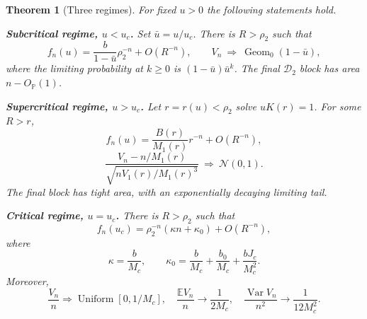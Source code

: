 \documentclass[11pt,a4paper]{article}
\numberwithin{equation}{section}
\newtheorem{theorem}{Theorem}[section]
\theoremstyle{definition}\newtheorem{definition}[theorem]{Definition}
\theoremstyle{remark}\newtheorem{remark}[theorem]{Remark}
\newcommand{\E}{\mathbb E}
\newcommand{\Prob}{\mathbb P}
\newcommand{\Var}{\operatorname{Var}}
\newcommand{\calD}{\mathcal D}
\DeclareMathOperator{\Unif}{Uniform}
\begin{document}
\begin{theorem}[Three regimes]\label{vmb:cw:thm:three}
For fixed $u>0$ the following statements hold.

\smallskip\noindent
\textbf{Subcritical regime, $u<u_c$.} Set $\bar u=u/u_c$. There is
$R>\rho_2$ such that
\begin{equation}\label{vmb:cw:eq:subcrit}
 f_n(u)=\frac b{1-\bar u}\rho_2^{-n}+O(R^{-n}),\qquad
 V_n\ \Longrightarrow\ \operatorname{Geom}_0(1-\bar u),
\end{equation}
where the limiting probability at $k\ge0$ is $(1-\bar u)\bar u^k$. The final
$\calD_2$ block has area $n-O_{\Prob}(1)$.

\smallskip\noindent
\textbf{Supercritical regime, $u>u_c$.} Let $r=r(u)<\rho_2$ solve $uK(r)=1$.
For some $R>r$,
\begin{equation}\label{vmb:cw:eq:supercrit}
 f_n(u)=\frac{B(r)}{M_1(r)}r^{-n}+O(R^{-n}),
\end{equation}
\begin{equation}\label{vmb:cw:eq:superCLT}
 \frac{V_n-n/M_1(r)}{\sqrt{nV_1(r)/M_1(r)^3}}
 \ \Longrightarrow\ \mathcal N(0,1).
\end{equation}
The final block has tight area, with an exponentially decaying limiting tail.

\smallskip\noindent
\textbf{Critical regime, $u=u_c$.} There is $R>\rho_2$ such that
\begin{equation}\label{vmb:cw:eq:criticalcount}
 f_n(u_c)=\rho_2^{-n}(\kappa n+\kappa_0)+O(R^{-n}),
\end{equation}
where
\begin{equation}\label{vmb:cw:eq:kappas}
 \kappa=\frac b{M_c},\qquad
 \kappa_0=\frac b{M_c}+\frac{b_0}{M_c}+\frac{bJ_c}{M_c^2}.
\end{equation}
Moreover,
\begin{equation}\label{vmb:cw:eq:uniform}
 \frac{V_n}{n}\Longrightarrow\Unif[0,1/M_c],\quad
 \frac{\E V_n}{n}\to\frac1{2M_c},\quad
 \frac{\Var V_n}{n^2}\to\frac1{12M_c^2}.
\end{equation}
\end{theorem}
\end{document}
